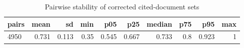 \begin{table}[ht]
\centering
\caption{Pairwise stability of corrected cited-document sets}
\scriptsize
\begin{tabular}{lrrrrrrrrr}
\toprule
pairs & mean & sd & min & p05 & p25 & median & p75 & p95 & max \\
\midrule
4950 & 0.731 & 0.113 & 0.35 & 0.545 & 0.667 & 0.733 & 0.8 & 0.923 & 1 \\
\bottomrule
\end{tabular}
\end{table}
